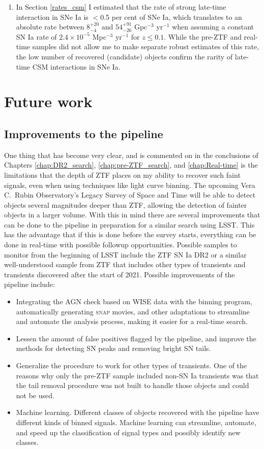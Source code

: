 \documentclass[a4paper,oneside,12pt, class=Latex/Classes/PhDthesisPSnPDF, crop=false]{standalone}
\begin{document}
\begin{enumerate}
	\item In Section \ref{rates_csm} I estimated that the rate of strong late-time interaction in SNe Ia is $<$0.5 per cent of SNe Ia, which translates to an absolute rate between $8_{-4}^{+20}$ and $54_{-26}^{+91}$ Gpc$^{-3}$ yr$^{-1}$ when assuming a constant SN Ia rate of $2.4\times10^{-5}$ Mpc$^{-3}$ yr$^{-1}$ for $z \leq 0.1$. While the pre-ZTF and real-time samples did not allow me to make separate robust estimates of this rate, the low number of recovered (candidate) objects confirm the rarity of late-time CSM interactions in SNe Ia.
\end{enumerate}


\section{Future work}
\subsection{Improvements to the pipeline}
One thing that has become very clear, and is commented on in the conclusions of Chapters \ref{chap:DR2_search}, \ref{chap:pre-ZTF_search}, and \ref{chap:Real-time} is the limitations that the depth of ZTF places on my ability to recover such faint signals, even when using techniques like light curve binning. The upcoming Vera C.~Rubin Observatory's Legacy Survey of Space and Time \cite[LSST;][]{LSST} will be able to detect objects several magnitudes deeper than ZTF, allowing the detection of fainter objects in a larger volume. With this in mind there are several improvements that can be done to the pipeline in preparation for a similar search using LSST. This has the advantage that if this is done before the survey starts, everything can be done in real-time with possible followup opportunities. Possible samples to monitor from the beginning of LSST include the ZTF SN Ia DR2 or a similar well-understood sample from ZTF that includes other types of transients and transients discovered after the start of 2021. Possible improvements of the pipeline include:

\begin{itemize}
	\item Integrating the AGN check based on WISE data with the binning program, automatically generating \textsc{snap} movies, and other adaptations to streamline and automate the analysis process, making it easier for a real-time search.
	\item Lessen the amount of false positives flagged by the pipeline, and improve the methods for detecting SN peaks and removing bright SN tails.
	\item Generalize the procedure to work for other types of transients. One of the reasons why only the pre-ZTF sample included non-SN Ia transients was that the tail removal procedure was not built to handle those objects and could not be used.
	\item Machine learning. Different classes of objects recovered with the pipeline have different kinds of binned signals. Machine learning can streamline, automate, and speed up the classification of signal types and possibly identify new classes.
\end{itemize}
\end{document}
